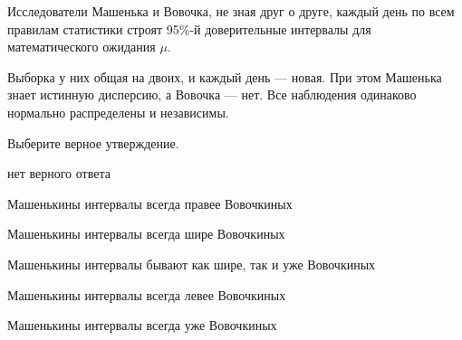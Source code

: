 
\begin{question}
Исследователи Машенька и Вовочка, не зная друг о друге, каждый день по
всем правилам статистики строят 95\%-й доверительные интервалы для
математического ожидания \(\mu\).

Выборка у них общая на двоих, и каждый день --- новая. При этом Машенька
знает истинную дисперсию, а Вовочка --- нет. Все наблюдения одинаково
нормально распределены и независимы.

Выберите верное утверждение.
\begin{answerlist}
  \item нет верного ответа
  \item Машенькины интервалы всегда правее Вовочкиных
  \item Машенькины интервалы всегда шире Вовочкиных
  \item Машенькины интервалы бывают как шире, так и уже Вовочкиных
  \item Машенькины интервалы всегда левее Вовочкиных
  \item Машенькины интервалы всегда уже Вовочкиных
\end{answerlist}
\end{question}


